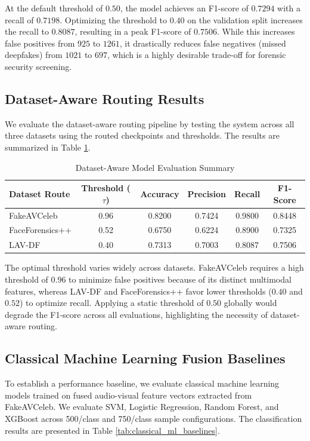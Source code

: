\documentclass[journal,10pt,onecolumn,draftclsnofoot]{IEEEtran}
\begin{document}
At the default threshold of $0.50$, the model achieves an F1-score of $0.7294$ with a recall of $0.7198$. Optimizing the threshold to $0.40$ on the validation split increases the recall to $0.8087$, resulting in a peak F1-score of $0.7506$. While this increases false positives from $925$ to $1261$, it drastically reduces false negatives (missed deepfakes) from $1021$ to $697$, which is a highly desirable trade-off for forensic security screening.

\subsection{Dataset-Aware Routing Results}
We evaluate the dataset-aware routing pipeline by testing the system across all three datasets using the routed checkpoints and thresholds. The results are summarized in Table \ref{tab:dataset_routing_summary}.

\begin{table}[htbp]
\caption{Dataset-Aware Model Evaluation Summary}
\label{tab:dataset_routing_summary}
\centering
\begin{tabular}{lccccc}
\toprule
Dataset Route & Threshold ($\tau$) & Accuracy & Precision & Recall & F1-Score \\
\midrule
FakeAVCeleb & 0.96 & 0.8200 & 0.7424 & 0.9800 & 0.8448 \\
FaceForensics++ & 0.52 & 0.6750 & 0.6224 & 0.8900 & 0.7325 \\
LAV-DF & 0.40 & 0.7313 & 0.7003 & 0.8087 & 0.7506 \\
\bottomrule
\end{tabular}
\end{table}

The optimal threshold varies widely across datasets. FakeAVCeleb requires a high threshold of $0.96$ to minimize false positives because of its distinct multimodal features, whereas LAV-DF and FaceForensics++ favor lower thresholds ($0.40$ and $0.52$) to optimize recall. Applying a static threshold of $0.50$ globally would degrade the F1-score across all evaluations, highlighting the necessity of dataset-aware routing.

\subsection{Classical Machine Learning Fusion Baselines}
To establish a performance baseline, we evaluate classical machine learning models trained on fused audio-visual feature vectors extracted from FakeAVCeleb. We evaluate SVM, Logistic Regression, Random Forest, and XGBoost across 500/class and 750/class sample configurations. The classification results are presented in Table \ref{tab:classical_ml_baselines}.
\end{document}
